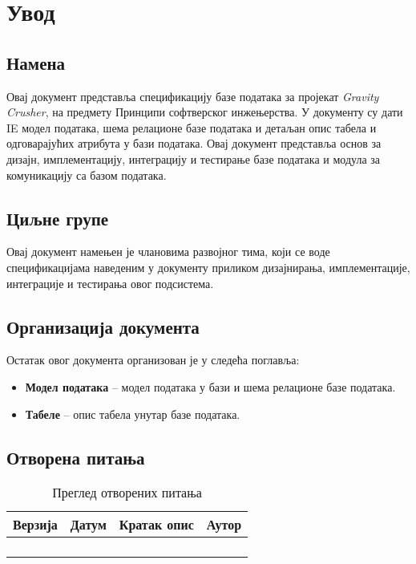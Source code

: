 \section{Увод}

\subsection{Намена}
Овај документ представља спецификацију базе података за пројекат \textit{Gravity
Crusher}, на предмету Принципи софтверског инжењерства. У документу су дати IE модел
података, шема релационе базе података и детаљан опис табела и одговарајућих атрибута у
бази података. Овај документ представља основ за дизајн, имплементацију, интеграцију и
тестирање базе података и модула за комуникацију са базом података.

\subsection{Циљне групе}
Овај документ намењен је члановима развојног тима, који се воде спецификацијама наведеним
у документу приликом дизајнирања, имплементације, интеграције и тестирања овог
подсистема.

\subsection{Организација документа}
Остатак овог документа организован је у следећа поглавља:
    \begin{itemize}
        \item \textbf{Модел података} -- модел података у бази и шема релационе базе
                     података.
        \item \textbf{Табеле} -- опис табела унутар базе података.
    \end{itemize}

\subsection{Отворена питања}

\begin{table}[h!]
\centering

    \begin{tabu}{ || X[l] | X[l] | X[l] | X[l] || }
    \hline
    \textbf{Верзија} & \textbf{Датум} & \textbf{Кратак опис} & \textbf{Аутор} \\
    \hline
    \hline
    & & &\\
    \hline
    & & &\\
    \hline
    & & &\\
    \hline
    & & &\\
    \hline
    \end{tabu}
    \caption{Преглед отворених питања}
    \label{table:2}

\end{table}





